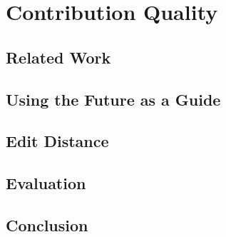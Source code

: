 \chapter{Contribution Quality}
\label{ch:editquality}





    \section{Related Work}
    \section{Using the Future as a Guide}
    \section{Edit Distance}
    \section{Evaluation}


    \section{Conclusion}

